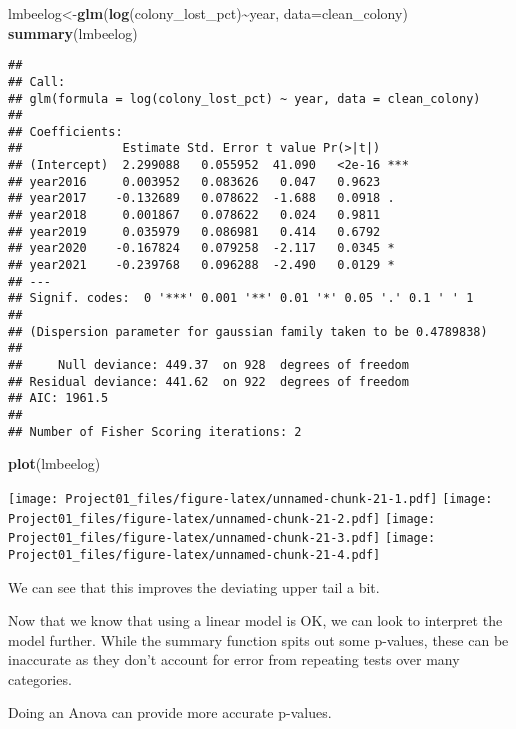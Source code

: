 \documentclass[
]{article}
\newenvironment{Shaded}{\begin{snugshade}}{\end{snugshade}}
\newcommand{\AttributeTok}[1]{\textcolor[rgb]{0.13,0.29,0.53}{#1}}
\newcommand{\FunctionTok}[1]{\textcolor[rgb]{0.13,0.29,0.53}{\textbf{#1}}}
\newcommand{\NormalTok}[1]{#1}
\newcommand{\OtherTok}[1]{\textcolor[rgb]{0.56,0.35,0.01}{#1}}
\newcommand{\SpecialCharTok}[1]{\textcolor[rgb]{0.81,0.36,0.00}{\textbf{#1}}}
\begin{document}
\begin{Shaded}
\begin{Highlighting}[]
\NormalTok{lmbeelog}\OtherTok{\textless{}{-}}\FunctionTok{glm}\NormalTok{(}\FunctionTok{log}\NormalTok{(colony\_lost\_pct)}\SpecialCharTok{\textasciitilde{}}\NormalTok{year, }\AttributeTok{data=}\NormalTok{clean\_colony)}
\FunctionTok{summary}\NormalTok{(lmbeelog)}
\end{Highlighting}
\end{Shaded}

\begin{verbatim}
## 
## Call:
## glm(formula = log(colony_lost_pct) ~ year, data = clean_colony)
## 
## Coefficients:
##              Estimate Std. Error t value Pr(>|t|)    
## (Intercept)  2.299088   0.055952  41.090   <2e-16 ***
## year2016     0.003952   0.083626   0.047   0.9623    
## year2017    -0.132689   0.078622  -1.688   0.0918 .  
## year2018     0.001867   0.078622   0.024   0.9811    
## year2019     0.035979   0.086981   0.414   0.6792    
## year2020    -0.167824   0.079258  -2.117   0.0345 *  
## year2021    -0.239768   0.096288  -2.490   0.0129 *  
## ---
## Signif. codes:  0 '***' 0.001 '**' 0.01 '*' 0.05 '.' 0.1 ' ' 1
## 
## (Dispersion parameter for gaussian family taken to be 0.4789838)
## 
##     Null deviance: 449.37  on 928  degrees of freedom
## Residual deviance: 441.62  on 922  degrees of freedom
## AIC: 1961.5
## 
## Number of Fisher Scoring iterations: 2
\end{verbatim}

\begin{Shaded}
\begin{Highlighting}[]
\FunctionTok{plot}\NormalTok{(lmbeelog)}
\end{Highlighting}
\end{Shaded}

\texttt{[image: Project01\_files/figure-latex/unnamed-chunk-21-1.pdf]}
\texttt{[image: Project01\_files/figure-latex/unnamed-chunk-21-2.pdf]}
\texttt{[image: Project01\_files/figure-latex/unnamed-chunk-21-3.pdf]}
\texttt{[image: Project01\_files/figure-latex/unnamed-chunk-21-4.pdf]}

We can see that this improves the deviating upper tail a bit.

Now that we know that using a linear model is OK, we can look to
interpret the model further. While the summary function spits out some
p-values, these can be inaccurate as they don't account for error from
repeating tests over many categories.

Doing an Anova can provide more accurate p-values.
\end{document}
